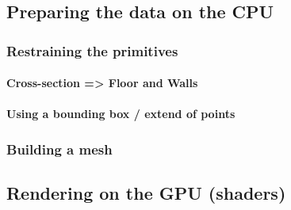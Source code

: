 \subsection{Preparing the data on the CPU}

\subsubsection{Restraining the primitives}

\paragraph{Cross-section => Floor and Walls}

\paragraph{Using a bounding box / extend of points}

\subsubsection{Building a mesh}

\subsection{Rendering on the GPU (shaders)}
